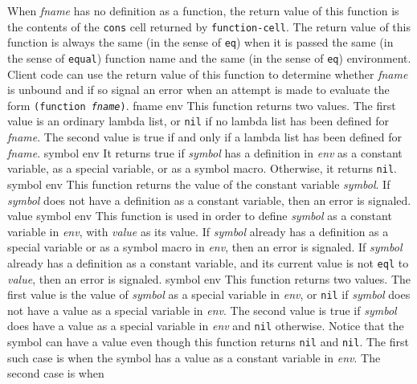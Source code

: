 When \textit{fname} has no definition as a function, the return
value of this function is the contents of the \texttt{cons} cell returned
by \texttt{function-cell}.  The return value of this function is always the
same (in the sense of \texttt{eq}) when it is passed the same (in the sense
of \texttt{equal}) function name and the same (in the sense of \texttt{eq})
environment.  Client code can use the return value of this
function to determine whether \textit{fname} is unbound and if so
signal an error when an attempt is made to evaluate the form
\texttt{(function \textrm{\textit{fname}})}.
\vskip -0.02cm
 {fname env}
\vskip -0.2cm
This function returns two values.  The first value is an ordinary
lambda list, or \texttt{nil} if no lambda list has been defined for
\textit{fname}.  The second value is true if and only if a lambda
list has been defined for \textit{fname}.
\vskip -0.02cm
 {symbol env}
\vskip -0.2cm
It returns true if \textit{symbol} has a definition in \textit{env} as a
constant variable, as a special variable, or as a symbol macro.
Otherwise, it returns \texttt{nil}.
\vskip -0.02cm
 {symbol env}
\vskip -0.2cm
This function returns the value of the constant
variable \textit{symbol}.
\vskip -0.02cm
If \textit{symbol} does not have a definition as a constant variable,
then an error is signaled.
\vskip -0.02cm
 {value symbol env}
\vskip -0.2cm
This function is used in order to define \textit{symbol} as a constant
variable in \textit{env}, with \textit{value} as its value.
\vskip -0.02cm
If \textit{symbol} already has a definition as a special variable or as a
symbol macro in \textit{env}, then an error is signaled.
\vskip -0.02cm
If \textit{symbol} already has a definition as a constant variable, and its
current value is not \texttt{eql} to \textit{value}, then an error is signaled.
\vskip -0.02cm
 {symbol env}
\vskip -0.2cm
This function returns two values.  The first value is the value of
\textit{symbol} as a special variable in \textit{env}, or \texttt{nil} if \textit{symbol}
does not have a value as a special variable in \textit{env}.  The
second value is true if \textit{symbol} does have a value as a special
variable in \textit{env} and \texttt{nil} otherwise.
\vskip -0.02cm
Notice that the symbol can have a value even though this function
returns \texttt{nil} and \texttt{nil}.  The first such case is when the symbol has a
value as a constant variable in \textit{env}.  The second case is when
